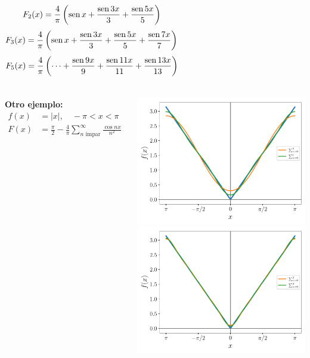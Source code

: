 \documentclass[9pt, aspectratio=169]{beamer}
\begin{document}
\begin{frame}
\begin{columns}[t]
 {\[F_2(x) = \frac{4}{\pi} \left( \operatorname{sen} x + \frac{\operatorname{sen} 3x}{3} + \frac{\operatorname{sen} 5 x}{5} \right) \]}
 {\[F_3(x) = \frac{4}{\pi} \left( \operatorname{sen} x + \frac{\operatorname{sen} 3x}{3} + \frac{\operatorname{sen} 5 x}{5}  + \frac{\operatorname{sen} 7 x}{7}\right) \]}
 {\[F_5(x) = \frac{4}{\pi} \left( \cdots + \frac{\operatorname{sen} 9x}{9} + \frac{\operatorname{sen} 11 x}{11}  + \frac{\operatorname{sen} 13 x}{13}\right) \]}
\end{columns}
\end{frame}

\begin{frame}
\begin{columns}[t]
\cx
\textbf{Otro ejemplo:}
\begin{align*}
f(x) &= |x|, \quad -\pi < x < \pi \\
F(x) &= \frac{\pi}{2} - \frac{4}{\pi} \sum_{n \text{ impar}}^{\infty} \frac{\cos nx}{n^2}
\end{align*}

\begin{center}
     {\includegraphics[scale=0.45]{figs/abs-01.pdf}}
     {\includegraphics[scale=0.45]{figs/abs-23.pdf}}
\end{center}
\pause 


\end{columns}
\end{frame}
\end{document}
